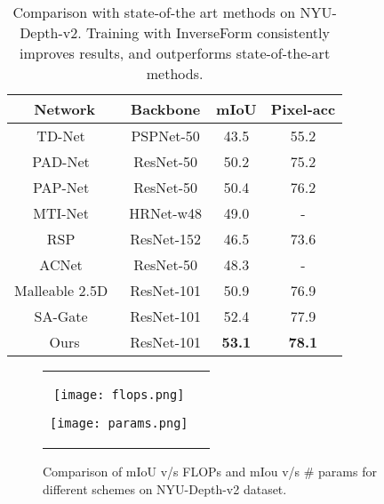 \documentclass[final]{cvpr}
\begin{document}
\begin{table}[t]

  \begin{tabular}{cc| cc} 
 \hline
 Network & Backbone & mIoU & Pixel-acc \\ 
 \hline
 \hline
  TD-Net~\cite{hu2020temporally} & PSPNet-50 & 43.5 & 55.2 \\ 
  PAD-Net~\cite{xu2018pad} & ResNet-50 & 50.2 & 75.2 \\   
  PAP-Net~\cite{zhang2019patternaffinitive} & ResNet-50 & 50.4 & 76.2 \\  
  MTI-Net~\cite{vandenhende2020mti} & HRNet-w48 & 49.0 & - \\   
  RSP~\cite{kong2017recurrent} & ResNet-152 & 46.5 & 73.6 \\
  ACNet~\cite{hu2019acnet} & ResNet-50 & 48.3 & - \\
  Malleable 2.5D~\cite{xing2020malleable} & ResNet-101 & 50.9 & 76.9 \\ 
  SA-Gate~\cite{chen2020bidirectional} & ResNet-101 & 52.4 & 77.9 \\ 
 \hline
  Ours & ResNet-101 & \textbf{53.1} & \textbf{78.1}\\
  \hline
\end{tabular}

\caption{ Comparison with state-of-the art methods on NYU-Depth-v2. Training with InverseForm consistently improves results, and outperforms state-of-the-art methods.}\label{tab:nyud_1}
\end{table}

\begin{figure}[t]
\begin{tabularx}{\textwidth}{cc}
    \hspace{-4mm}
     \texttt{[image: flops.png]}

     \texttt{[image: params.png]}
\end{tabularx}

\caption{Comparison of mIoU v/s FLOPs and mIou v/s \# params for different schemes on NYU-Depth-v2 dataset.}\label{fig:miou_flops_nyud}
\end{figure}
\end{document}
